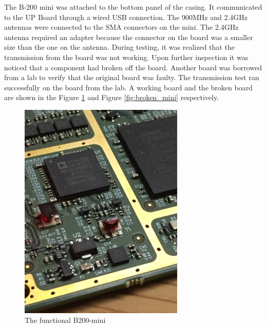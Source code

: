 The B-200 mini was attached to the bottom panel of the casing. It communicated to the UP Board through a wired USB connection. The 900MHz and 2.4GHz antennas were connected to the SMA connectors on the mini. The 2.4GHz antenna required an adapter because the connector on the board was a smaller size than the one on the antenna. During testing, it was realized that the transmission from the board was not working. Upon further inspection it was noticed that a component had broken off the board. Another board was borrowed from a lab to verify that the original board was faulty. The transmission test ran successfully on the board from the lab. A working board and the broken board are shown in the Figure \ref{fig:working_mini} and Figure \ref{fig:broken_mini} respectively.
\begin{figure}[ht!]
	\centering
	\includegraphics[width=0.70\textwidth]{img/working_mini.jpg}
	\caption{The functional B200-mini}
	\label{fig:working_mini}
\end{figure}\par
